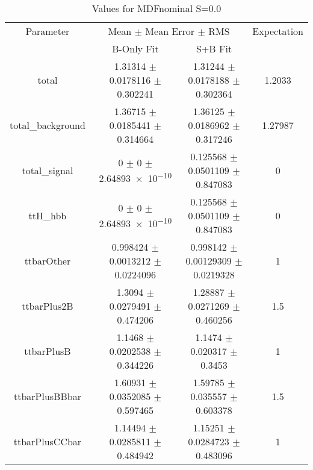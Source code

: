 \begin{table}
\centering
\caption{Values for MDFnominal S=0.0}
\begin{tabular}{cccc}
\toprule
Parameter & \multicolumn{2}{c}{Mean $\pm$ Mean Error $\pm$ RMS} & Expectation\\
 & B-Only Fit & S+B Fit & \\
\midrule
total & \num{1.31314} $\pm$ \num{0.0178116} $\pm$ \num{0.302241} & \num{1.31244} $\pm$ \num{0.0178188} $\pm$ \num{0.302364} & \num{1.2033}\\
total\_background & \num{1.36715} $\pm$ \num{0.0185441} $\pm$ \num{0.314664} & \num{1.36125} $\pm$ \num{0.0186962} $\pm$ \num{0.317246} & \num{1.27987}\\
total\_signal & \num{0} $\pm$ \num{0} $\pm$ \num{2.64893e-10} & \num{0.125568} $\pm$ \num{0.0501109} $\pm$ \num{0.847083} & \num{0}\\
ttH\_hbb & \num{0} $\pm$ \num{0} $\pm$ \num{2.64893e-10} & \num{0.125568} $\pm$ \num{0.0501109} $\pm$ \num{0.847083} & \num{0}\\
ttbarOther & \num{0.998424} $\pm$ \num{0.0013212} $\pm$ \num{0.0224096} & \num{0.998142} $\pm$ \num{0.00129309} $\pm$ \num{0.0219328} & \num{1}\\
ttbarPlus2B & \num{1.3094} $\pm$ \num{0.0279491} $\pm$ \num{0.474206} & \num{1.28887} $\pm$ \num{0.0271269} $\pm$ \num{0.460256} & \num{1.5}\\
ttbarPlusB & \num{1.1468} $\pm$ \num{0.0202538} $\pm$ \num{0.344226} & \num{1.1474} $\pm$ \num{0.020317} $\pm$ \num{0.3453} & \num{1}\\
ttbarPlusBBbar & \num{1.60931} $\pm$ \num{0.0352085} $\pm$ \num{0.597465} & \num{1.59785} $\pm$ \num{0.035557} $\pm$ \num{0.603378} & \num{1.5}\\
ttbarPlusCCbar & \num{1.14494} $\pm$ \num{0.0285811} $\pm$ \num{0.484942} & \num{1.15251} $\pm$ \num{0.0284723} $\pm$ \num{0.483096} & \num{1}\\
\bottomrule
\end{tabular}
\end{table}